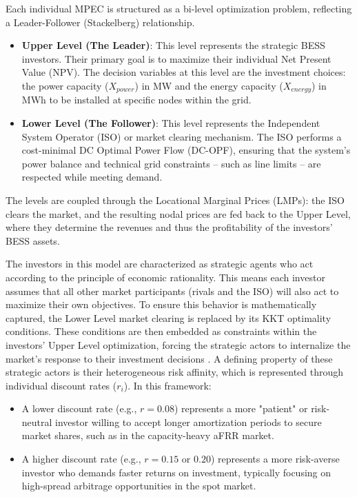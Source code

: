 Each individual MPEC is structured as a bi-level optimization problem, reflecting a Leader-Follower (Stackelberg) relationship.
\begin{itemize}
    \item \textbf{Upper Level (The Leader)}: This level represents the strategic BESS investors. Their primary goal is to maximize their individual Net Present Value (NPV). The decision variables at this level are the investment choices: the power capacity (\(X_{power}\)) in MW and the energy capacity (\(X_{energy}\)) in MWh to be installed at specific nodes within the grid.
     \item \textbf{Lower Level (The Follower)}: This level represents the Independent System Operator (ISO) or market clearing mechanism. The ISO performs a cost-minimal DC Optimal Power Flow (DC-OPF), ensuring that the system's power balance and technical grid constraints -- such as line limits -- are respected while meeting demand.
\end{itemize}

The levels are coupled through the Locational Marginal Prices (LMPs): the ISO clears the market, and the resulting nodal prices are fed back to the Upper Level, where they determine the revenues and thus the profitability of the investors' BESS assets.

The investors in this model are characterized as strategic agents who act according to the principle of economic rationality. This means each investor assumes that all other market participants (rivals and the ISO) will also act to maximize their own objectives. To ensure this behavior is mathematically captured, the Lower Level market clearing is replaced by its KKT optimality conditions. These conditions are then embedded as constraints within the investors' Upper Level optimization, forcing the strategic actors to internalize the market's response to their investment decisions \cite{conejo_complementarity_2020}.
A defining property of these strategic actors is their heterogeneous risk affinity, which is represented through individual discount rates (\(r_{i}\)). In this framework:
\begin{itemize}
    \item A lower discount rate (e.g., \(r=0.08\)) represents a more "patient" or risk-neutral investor willing to accept longer amortization periods to secure market shares, such as in the capacity-heavy aFRR market.
    \item A higher discount rate (e.g., \(r=0.15\) or \(0.20\)) represents a more risk-averse investor who demands faster returns on investment, typically focusing on high-spread arbitrage opportunities in the spot market.
\end{itemize}

